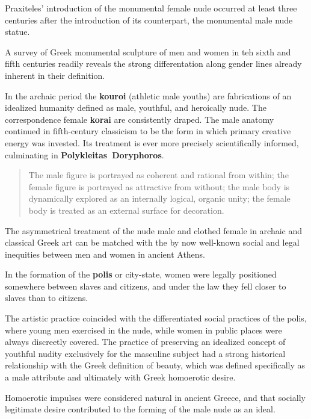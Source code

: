 Praxiteles' introduction of the monumental female nude occurred at least three centuries after the introduction of its counterpart, the monumental male nude statue.

\begin{rmk}
    A survey of Greek monumental sculpture of men and women in teh sixth and fifth centuries readily reveals the strong differentation along gender lines already inherent in their definition. 
\end{rmk}

In the archaic period the \textbf{kouroi} (athletic male youths) are fabrications of an idealized humanity defined as male, youthful, and heroically nude. The correspondence female \textbf{korai} are consistently draped. The male anatomy continued in fifth-century classicism to be the form in which primary creative energy was invested. Its treatment is ever more precisely scientifically informed, culminating in \textbf{Polykleitas\ Doryphoros}.

\begin{quotation}
    The male figure is portrayed as coherent and rational from within; the female figure is portrayed as attractive from without; the male body is dynamically explored as an internally logical, organic unity; the female body is treated as an external surface for decoration.
\end{quotation}

The asymmetrical treatment of the nude male and clothed female in archaic and classical Greek art can be matched with the by now well-known social and legal inequities between men and women in ancient Athens. 

\begin{nte}
    In the formation of the \textbf{polis} or city-state, women were legally positioned somewhere between slaves and citizens, and under the law they fell closer to slaves than to citizens.
\end{nte}

The artistic practice coincided with the differentiated social practices of the polis, where young men exercised in the nude, while women in public places were always discreetly covered. The practice of preserving an idealized concept of youthful nudity exclusively for the masculine subject had a strong historical relationship with the Greek definition of beauty, which was defined specifically as a male attribute and ultimately with Greek homoerotic desire. 

\begin{nte}
    Homoerotic impulses were considered natural in ancient Greece, and that socially legitimate desire contributed to the forming of the male nude as an ideal.
\end{nte}


